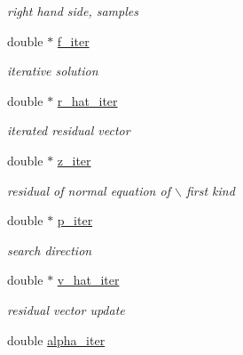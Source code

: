\begin{CompactItemize}
\begin{CompactList}\small\item\em right hand side, samples \item\end{CompactList}\item 
\hypertarget{structinfct__adjoint__plan_o5}{
double $\ast$ \hyperlink{structinfct__adjoint__plan_o5}{f\_\-iter}}
\label{structinfct__adjoint__plan_o5}

\begin{CompactList}\small\item\em iterative solution \item\end{CompactList}\item 
\hypertarget{structinfct__adjoint__plan_o6}{
double $\ast$ \hyperlink{structinfct__adjoint__plan_o6}{r\_\-hat\_\-iter}}
\label{structinfct__adjoint__plan_o6}

\begin{CompactList}\small\item\em iterated residual vector \item\end{CompactList}\item 
\hypertarget{structinfct__adjoint__plan_o7}{
double $\ast$ \hyperlink{structinfct__adjoint__plan_o7}{z\_\-iter}}
\label{structinfct__adjoint__plan_o7}

\begin{CompactList}\small\item\em residual of normal equation of $\backslash$ first kind \item\end{CompactList}\item 
\hypertarget{structinfct__adjoint__plan_o8}{
double $\ast$ \hyperlink{structinfct__adjoint__plan_o8}{p\_\-iter}}
\label{structinfct__adjoint__plan_o8}

\begin{CompactList}\small\item\em search direction \item\end{CompactList}\item 
\hypertarget{structinfct__adjoint__plan_o9}{
double $\ast$ \hyperlink{structinfct__adjoint__plan_o9}{v\_\-hat\_\-iter}}
\label{structinfct__adjoint__plan_o9}

\begin{CompactList}\small\item\em residual vector update \item\end{CompactList}\item 
\hypertarget{structinfct__adjoint__plan_o10}{
double \hyperlink{structinfct__adjoint__plan_o10}{alpha\_\-iter}}
\label{structinfct__adjoint__plan_o10}


\end{CompactItemize}
